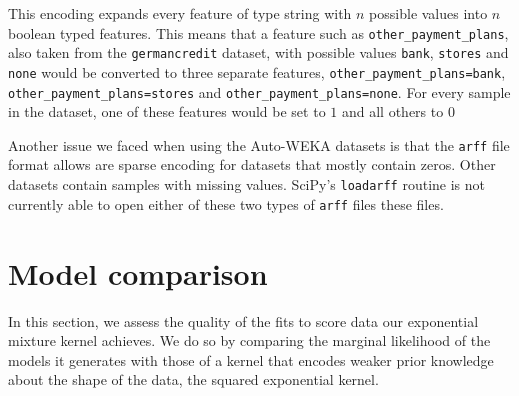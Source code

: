\documentclass[a4paper,12pt,twoside,openright]{report}
\begin{document}
This encoding expands every feature of type string with $n$ possible values into $n$ boolean typed features. This means that a feature such as \texttt{other\_payment\_plans}, also taken from the \texttt{germancredit} dataset, with possible values \texttt{bank}, \texttt{stores} and \texttt{none} would be converted to three separate features, \texttt{other\_payment\_plans=bank}, \texttt{other\_payment\_plans=stores} and \texttt{other\_payment\_plans=none}. For every sample in the dataset, one of these features would be set to $1$ and all others to $0$

Another issue we faced when using the Auto-WEKA datasets is that the \texttt{arff} file format allows are sparse encoding for datasets that mostly contain zeros. Other datasets contain samples with missing values. SciPy's \texttt{loadarff} routine is not currently able to open either of these two types of \texttt{arff} files these files.


\section{Model comparison}
In this section, we assess the quality of the fits to score data our exponential mixture kernel achieves. We do so by comparing the marginal likelihood of the models it generates with those of a kernel that encodes weaker prior knowledge about the shape of the data, the squared exponential kernel.


\end{document}
